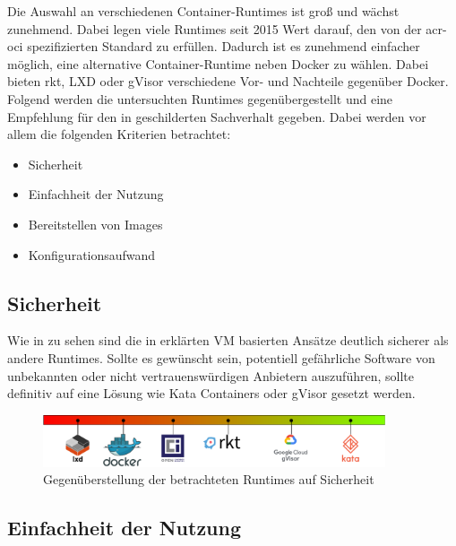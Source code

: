 Die Auswahl an verschiedenen Container-Runtimes ist groß und wächst zunehmend. Dabei legen viele Runtimes seit 2015 Wert darauf, den von der \gls{acr-oci} spezifizierten Standard zu erfüllen. Dadurch ist es zunehmend einfacher möglich, eine alternative Container-Runtime neben Docker zu wählen. Dabei bieten rkt, LXD oder gVisor verschiedene Vor- und Nachteile gegenüber Docker. Folgend werden die untersuchten Runtimes gegenübergestellt und eine Empfehlung für den in  geschilderten Sachverhalt gegeben. Dabei werden vor allem die folgenden Kriterien betrachtet:
\begin{itemize}
	\item Sicherheit
	\item Einfachheit der Nutzung
	\item Bereitstellen von Images
	\item Konfigurationsaufwand
\end{itemize}

\subsection{Sicherheit}
\label{sec:compFazitSec}


Wie in  zu sehen sind die in  erklärten VM basierten Ansätze deutlich sicherer als andere Runtimes. Sollte es gewünscht sein, potentiell gefährliche Software von unbekannten oder nicht vertrauenswürdigen Anbietern auszuführen, sollte definitiv auf eine Lösung wie Kata Containers oder gVisor gesetzt werden.

\begin{figure}[h]
	\begin{center}
		\includegraphics[width=0.9\textwidth]{bilder/rating-sec.pdf}
		\caption{Gegenüberstellung der betrachteten Runtimes auf Sicherheit}
		\label{fig:compFazitSec}
	\end{center}
\end{figure}

\subsection{Einfachheit der Nutzung}
\label{sec:compFazitEoU}

